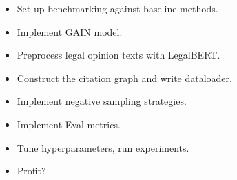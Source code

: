 \documentclass{article}
\begin{document}
\begin{itemize}[leftmargin=*, noitemsep]
  \item Set up benchmarking against baseline methods.
  \item Implement GAIN model.
  \item Preprocess legal opinion texts with LegalBERT.
  \item Construct the citation graph and write dataloader.
  \item Implement negative sampling strategies.
  \item Implement Eval metrics.
  \item Tune hyperparameters, run experiments.
  \item Profit?
\end{itemize}



\end{document}

